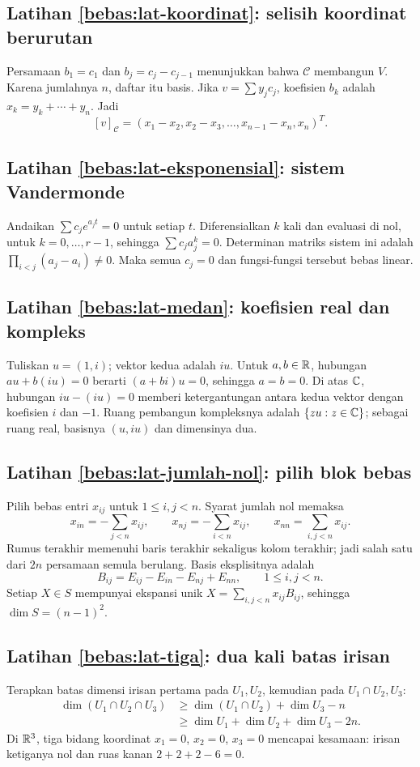 \subsection*{Latihan \ref{bebas:lat-koordinat}: selisih koordinat berurutan}
Persamaan $b_1=c_1$ dan $b_j=c_j-c_{j-1}$ menunjukkan bahwa
$\mathcal C$ membangun $V$. Karena jumlahnya $n$, daftar itu basis.
Jika $v=\sum y_jc_j$, koefisien $b_k$ adalah
$x_k=y_k+\cdots+y_n$. Jadi
\[
    [v]_{\mathcal C}=(x_1-x_2,x_2-x_3,\ldots,x_{n-1}-x_n,x_n)^T.
\]

\subsection*{Latihan \ref{bebas:lat-eksponensial}: sistem Vandermonde}
Andaikan $\sum c_je^{a_jt}=0$ untuk setiap $t$.
Diferensialkan $k$ kali dan evaluasi di nol, untuk
$k=0,\ldots,r-1$, sehingga $\sum c_ja_j^k=0$.
Determinan matriks sistem ini adalah
$\prod_{i<j}(a_j-a_i)\ne0$. Maka semua $c_j=0$ dan
fungsi-fungsi tersebut bebas linear.

\subsection*{Latihan \ref{bebas:lat-medan}: koefisien real dan kompleks}
Tuliskan $u=(1,i)$; vektor kedua adalah $iu$.
Untuk $a,b\in\mathbb{R}$, hubungan $au+b(iu)=0$ berarti
$(a+bi)u=0$, sehingga $a=b=0$.
Di atas $\mathbb{C}$, hubungan $iu-(iu)=0$ memberi ketergantungan
antara kedua vektor dengan koefisien $i$ dan $-1$.
Ruang pembangun kompleksnya adalah $\{zu:z\in\mathbb{C}\}$;
sebagai ruang real, basisnya $(u,iu)$ dan dimensinya dua.

\subsection*{Latihan \ref{bebas:lat-jumlah-nol}: pilih blok bebas}
Pilih bebas entri $x_{ij}$ untuk $1\le i,j<n$.
Syarat jumlah nol memaksa
\[
    x_{in}=-\sum_{j<n}x_{ij},\qquad
    x_{nj}=-\sum_{i<n}x_{ij},\qquad
    x_{nn}=\sum_{i,j<n}x_{ij}.
\]
Rumus terakhir memenuhi baris terakhir sekaligus kolom terakhir;
jadi salah satu dari $2n$ persamaan semula berulang.
Basis eksplisitnya adalah
\[
    B_{ij}=E_{ij}-E_{in}-E_{nj}+E_{nn},\qquad 1\le i,j<n.
\]
Setiap $X\in S$ mempunyai ekspansi unik
$X=\sum_{i,j<n}x_{ij}B_{ij}$, sehingga $\dim S=(n-1)^2$.

\subsection*{Latihan \ref{bebas:lat-tiga}: dua kali batas irisan}
Terapkan batas dimensi irisan pertama pada $U_1,U_2$, kemudian
pada $U_1\cap U_2,U_3$:
\begin{align*}
    \dim(U_1\cap U_2\cap U_3)
    &\ge\dim(U_1\cap U_2)+\dim U_3-n\\
    &\ge\dim U_1+\dim U_2+\dim U_3-2n.
\end{align*}
Di $\mathbb{R}^3$, tiga bidang koordinat $x_1=0$, $x_2=0$, $x_3=0$
mencapai kesamaan: irisan ketiganya nol dan ruas kanan $2+2+2-6=0$.

